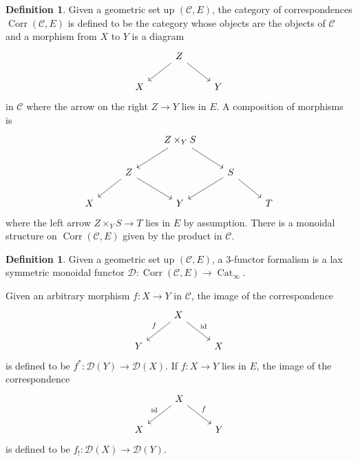 \documentclass{article}
\theoremstyle{definition}
\newtheorem{definition}[theorem]{Definition}
\theoremstyle{remark}
\DeclareMathOperator{\corr}{Corr}
\DeclareMathOperator{\cat}{Cat}
\begin{document}
\begin{definition} Given a geometric set up $(\mathcal{C},E)$, the category of correspondences $\corr(\mathcal{C},E)$ is defined to be the category whose objects are the objects of $\mathcal{C}$ and a morphism from $X$ to $Y$ is a diagram
\[\begin{tikzcd}
  & Z \\
  X && Y
  \arrow[from=1-2, to=2-1]
  \arrow[from=1-2, to=2-3]
\end{tikzcd}\]
in $\mathcal{C}$ where the arrow on the right $Z \to Y$ lies in $E$. A composition of morphisms is
\[\begin{tikzcd}
  && {Z \times_YS} \\
  & Z && S \\
  X && Y && T
  \arrow[from=1-3, to=2-2]
  \arrow[from=1-3, to=2-4]
  \arrow[from=2-2, to=3-1]
  \arrow[from=2-2, to=3-3]
  \arrow[from=2-4, to=3-3]
  \arrow[from=2-4, to=3-5]
\end{tikzcd}\]
where the left arrow $Z \times_Y S \to T$ lies in $E$ by assumption. There is a monoidal structure on $\corr(\mathcal{C},E)$ given by the product in $\mathcal{C}$.
\end{definition}


\begin{definition} Given a geometric set up $(\mathcal{C},E)$, a 3-functor formalism is a lax symmetric monoidal functor $\mathcal{D}: \corr(\mathcal{C},E) \to \cat_\infty$.
\end{definition}

Given an arbitrary morphism $f: X \to Y$ in $\mathcal{C}$, the image of the correspondence
\[\begin{tikzcd}
  & X \\
  Y && X
  \arrow["f"', from=1-2, to=2-1]
  \arrow["{\text{id}}", from=1-2, to=2-3]
\end{tikzcd}\]
is defined to be $f^*: \mathcal{D}(Y) \to \mathcal{D}(X)$. If $f: X \to Y$ lies in $E$, the image of the correspondence
\[\begin{tikzcd}
  & X \\
  X && Y
  \arrow["{\text{id}}"', from=1-2, to=2-1]
  \arrow["f", from=1-2, to=2-3]
\end{tikzcd}\]
is defined to be $f_!: \mathcal{D}(X) \to \mathcal{D}(Y)$.
\end{document}
